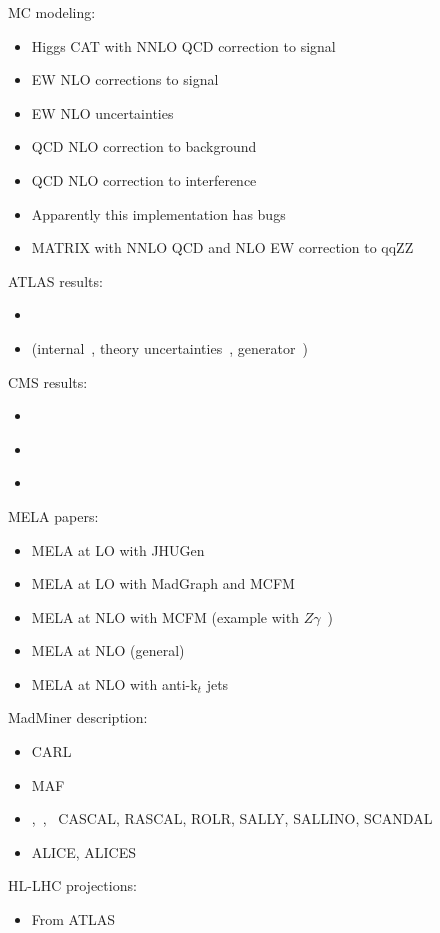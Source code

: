 \documentclass[11pt,letterpaper]{article}
\begin{document}
MC modeling:
\begin{itemize}
  \item \cite{Passarino:2013bha} Higgs CAT with NNLO QCD correction to signal
  \item \cite{Biedermann:2016yvs} EW NLO corrections to signal
  \item \cite{Gieseke:2014gkab} EW NLO uncertainties
  \item \cite{Caola:2015psa} QCD NLO correction to background
  \item \cite{Caola:2016trd} QCD NLO correction to interference
  \item \cite{Alioli:2016xab} Apparently this implementation has bugs
  \item \cite{Kallweit:2019zez} MATRIX with NNLO QCD and NLO EW correction to qqZZ
\end{itemize}

ATLAS results:
\begin{itemize}
  \item \cite{Aad:2015xua}
  \item \cite{Aaboud:2018puo} (internal~\cite{Abidi:2231604}, theory uncertainties~\cite{Meyer:2232040}, generator~\cite{ATL-PHYS-PUB-2017-005})
\end{itemize}

CMS results:
\begin{itemize}
  \item \cite{Khachatryan:2014iha}
  \item \cite{Khachatryan:2016ctc}
  \item \cite{Sirunyan:2019twz}
\end{itemize}

MELA papers:
\begin{itemize}
  \item \cite{Bolognesi:2012mm} MELA at LO with JHUGen
  \item \cite{Avery:2012um} MELA at LO with MadGraph and MCFM
  \item \cite{Campbell:2012cz} MELA at NLO with MCFM (example with $Z\gamma$~\cite{Campbell:2013hz})
  \item \cite{Martini:2015fsa} MELA at NLO (general)  
  \item \cite{Kraus:2019qoq} MELA at NLO with anti-k$_t$ jets
\end{itemize}

MadMiner description:
\begin{itemize}
  \item \cite{Cranmer:2015bka} CARL
  \item \cite{papamakarios2017masked} MAF
  \item \cite{Brehmer:2018kdj},~\cite{Brehmer:2018hga},~\cite{Brehmer:2018eca}  CASCAL, RASCAL, ROLR, SALLY, SALLINO, SCANDAL
  \item \cite{Stoye:2018ovl} ALICE, ALICES
\end{itemize}

HL-LHC projections:
\begin{itemize}
  \item \cite{ATL-PHYS-PUB-2015-024} From ATLAS
\end{itemize}



\end{document}

